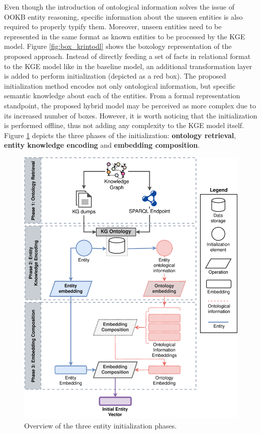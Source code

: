 Even though the introduction of ontological information solves the issue of OOKB entity reasoning, specific information about the unseen entities is also required to properly typify them. Moreover, unseen entities need to be represented in the same format as known entities to be processed by the KGE model. Figure \ref{fig:box_krintodl} shows the boxology representation of the proposed approach. Instead of directly feeding a set of facts in relational format to the KGE model like in the baseline model, an additional transformation layer is added to perform initialization (depicted as a red box). The proposed initialization method encodes not only ontological information, but specific semantic knowledge about each of the entities. From a formal representation standpoint, the proposed hybrid model may be perceived as more complex due to its increased number of boxes. However, it is worth noticing that the initialization is performed offline, thus not adding any complexity to the KGE model itself. Figure \ref{fig:semantic_based_initialization} depicts the three phases of the initialization: \textbf{ontology retrieval}, \textbf{entity knowledge encoding} and \textbf{embedding composition}.

\begin{figure}
    \centering
    \includegraphics[width=.9\linewidth]{4_kbsintegrationdl/figures/Initialization_phases.eps}
    \caption{Overview of the three entity initialization phases.}
    \label{fig:semantic_based_initialization}
\end{figure}

